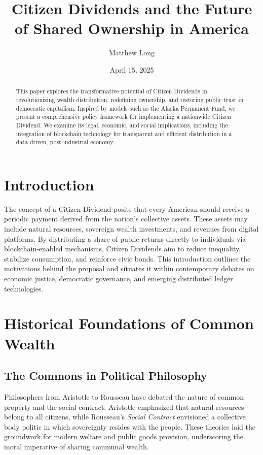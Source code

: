 \documentclass[11pt]{article}
\title{Citizen Dividends and the Future of Shared Ownership in America}
\author{Matthew Long}
\date{April 15, 2025}
\begin{document}
\maketitle

\begin{abstract}
This paper explores the transformative potential of Citizen Dividends in revolutionizing wealth distribution, redefining ownership, and restoring public trust in democratic capitalism. Inspired by models such as the Alaska Permanent Fund, we present a comprehensive policy framework for implementing a nationwide Citizen Dividend. We examine its legal, economic, and social implications, including the integration of blockchain technology for transparent and efficient distribution in a data-driven, post-industrial economy.
\end{abstract}

\section{Introduction}
The concept of a Citizen Dividend posits that every American should receive a periodic payment derived from the nation’s collective assets. These assets may include natural resources, sovereign wealth investments, and revenues from digital platforms. By distributing a share of public returns directly to individuals via blockchain-enabled mechanisms, Citizen Dividends aim to reduce inequality, stabilize consumption, and reinforce civic bonds. This introduction outlines the motivations behind the proposal and situates it within contemporary debates on economic justice, democratic governance, and emerging distributed ledger technologies.

\section{Historical Foundations of Common Wealth}
\subsection{The Commons in Political Philosophy}
Philosophers from Aristotle to Rousseau have debated the nature of common property and the social contract. Aristotle emphasized that natural resources belong to all citizens, while Rousseau’s \textit{Social Contract} envisioned a collective body politic in which sovereignty resides with the people. These theories laid the groundwork for modern welfare and public goods provision, underscoring the moral imperative of sharing communal wealth.
\end{document}
